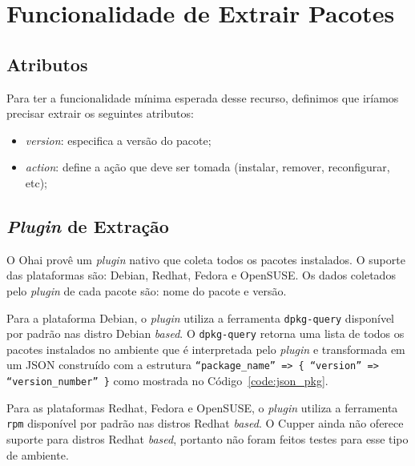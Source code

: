\section{Funcionalidade de Extrair Pacotes}
\label{sec:pacotes}

\subsection{Atributos}
Para ter a funcionalidade mínima esperada desse recurso, definimos que iríamos
precisar extrair os seguintes atributos:

\begin{itemize}
  \item \textit{version}: especifica a versão do pacote;
  \item \textit{action}: define a ação que deve ser tomada
    (instalar, remover, reconfigurar, etc);
\end{itemize}

\subsection{\textit{Plugin} de Extração}

O Ohai provê um \textit{plugin} nativo que coleta todos os pacotes instalados. O suporte
das plataformas são: Debian, Redhat, Fedora e OpenSUSE\@. Os dados coletados pelo
\textit{plugin} de cada pacote são: nome do pacote e versão.

Para a plataforma Debian, o \textit{plugin} utiliza a ferramenta \texttt{dpkg-query} disponível
por padrão nas distro Debian \textit{based}. O \texttt{dpkg-query} retorna uma lista de todos os pacotes
instalados no ambiente que é interpretada pelo \textit{plugin} e transformada em um JSON
construído com a estrutura \texttt{``package\_name'' => \{ ``version'' => ``version\_number'' \}}
como mostrada no Código~\ref{code:json_pkg}.

\noindent\begin{minipage}{\textwidth}
  \lstset{style=shell}
  
\end{minipage}\hfill

Para as plataformas Redhat, Fedora e OpenSUSE, o \textit{plugin} utiliza a ferramenta \texttt{rpm}
disponível por padrão nas distros Redhat \textit{based}. O Cupper ainda não oferece suporte
para distros Redhat \textit{based}, portanto não foram feitos testes para esse tipo de ambiente.

